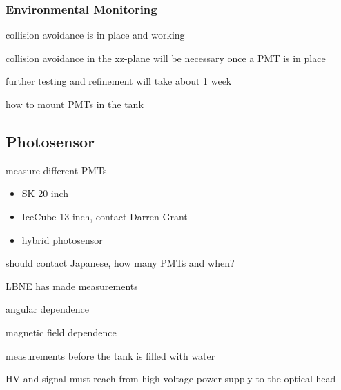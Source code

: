 \subsubsection{Environmental Monitoring}




collision avoidance is in place and working

collision avoidance in the xz-plane will be necessary once a PMT is in place

further testing and refinement will take about 1 week

how to mount PMTs in the tank




\subsection{Photosensor}

measure different PMTs
\begin{itemize}
\item SK 20 inch
\item IceCube 13 inch, contact Darren Grant
\item hybrid photosensor
\end{itemize}

should contact Japanese, how many PMTs and when?

LBNE has made measurements

angular dependence

magnetic field dependence


measurements before the tank is filled with water

HV and signal must reach from high voltage power supply to the optical
head

